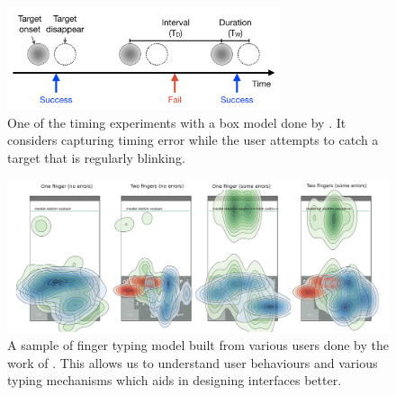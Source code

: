 \documentclass{article}
\begin{document}
\begin{itemize}
\begin{figure}[t]
\centering
 \includegraphics[width=8cm]{figures/boxmodel.png}
    \caption{One of the timing experiments with a box model done by \cite{lee2017boxer}. It considers capturing timing error while the user attempts to catch a target that is regularly blinking.
 }\label{fig:boxmodel}
\end{figure}

\begin{figure}[t]
\centering
 \includegraphics[width=12cm]{figures/fingermodel.png}
    \caption{A sample of finger typing model built from various users done by the work of \cite{jiangwe}. This allows us to understand user behaviours and various typing mechanisms which aids in designing interfaces better.
 }\label{fig:fingermodel}
\end{figure}


\end{itemize}
\end{document}
